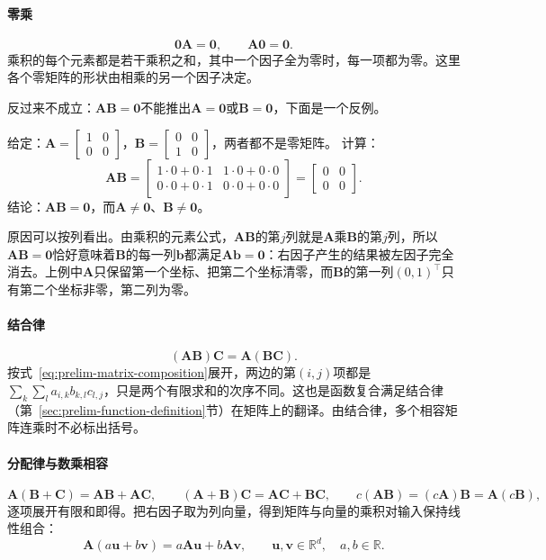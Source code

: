 \paragraph{零乘}
\[
 \bm0\bm A=\bm0,\qquad\bm A\bm0=\bm0.
\]
乘积的每个元素都是若干乘积之和，其中一个因子全为零时，每一项都为零。这里各个零矩阵的形状由相乘的另一个因子决定。

反过来不成立：$\bm A\bm B=\bm0$不能推出$\bm A=\bm0$或$\bm B=\bm0$，下面是一个反例。
\begin{example}[反例：两个非零矩阵的乘积为零]
\label{ex:ls-zero-product-nonzero-factors}
给定：$\bm A=\left[\begin{smallmatrix}1&0\\0&0\end{smallmatrix}\right]$，$\bm B=\left[\begin{smallmatrix}0&0\\1&0\end{smallmatrix}\right]$，两者都不是零矩阵。
计算：
\[
 \bm A\bm B=\begin{bmatrix}1\cdot0+0\cdot1&1\cdot0+0\cdot0\\0\cdot0+0\cdot1&0\cdot0+0\cdot0\end{bmatrix}=\begin{bmatrix}0&0\\0&0\end{bmatrix}.
\]
结论：$\bm A\bm B=\bm0$，而$\bm A\neq\bm0$、$\bm B\neq\bm0$。
\end{example}
原因可以按列看出。由乘积的元素公式，$\bm A\bm B$的第$j$列就是$\bm A$乘$\bm B$的第$j$列，所以$\bm A\bm B=\bm0$恰好意味着$\bm B$的每一列$\bm b$都满足$\bm A\bm b=\bm0$：右因子产生的结果被左因子完全消去。上例中$\bm A$只保留第一个坐标、把第二个坐标清零，而$\bm B$的第一列$(0,1)^\top$只有第二个坐标非零，第二列为零。

\paragraph{结合律}
\[
 (\bm A\bm B)\bm C=\bm A(\bm B\bm C).
\]
按式~\eqref{eq:prelim-matrix-composition}展开，两边的第$(i,j)$项都是$\sum_k\sum_l a_{i,k}b_{k,l}c_{l,j}$，只是两个有限求和的次序不同。这也是函数复合满足结合律（第~\ref{sec:prelim-function-definition}节）在矩阵上的翻译。由结合律，多个相容矩阵连乘时不必标出括号。

\paragraph{分配律与数乘相容}
\[
 \bm A(\bm B+\bm C)=\bm A\bm B+\bm A\bm C,\qquad
 (\bm A+\bm B)\bm C=\bm A\bm C+\bm B\bm C,\qquad
 c(\bm A\bm B)=(c\bm A)\bm B=\bm A(c\bm B),
\]
逐项展开有限和即得。把右因子取为列向量，得到矩阵与向量的乘积对输入保持线性组合：
\begin{equation}
 \bm A(a\bm u+b\bm v)=a\bm A\bm u+b\bm A\bm v,
 \qquad\bm u,\bm v\in\mathbb R^d,\quad a,b\in\mathbb R.
 \label{eq:prelim-matrix-linearity}
\end{equation}

